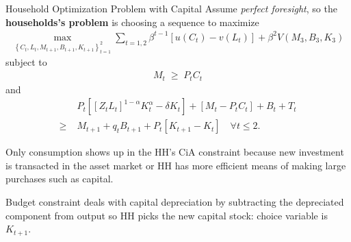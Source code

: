 \documentclass[10pt,c,aspectratio=1610,handout]{beamer}
\begin{document}
\begin{frame}{Household Optimization Problem with Capital}
  Assume \emph{perfect foresight}, so the \textbf{households's problem} is choosing a sequence to maximize%
  \begin{align*}%
    \max_{\left\{ C_{t},L_{t},M_{t+1},B_{t+1},K_{t+1}\right\}_{t=1}^{2}} \sum_{t=1,2} \beta^{t-1} \left[ u(C_{t})-v(L_{t}) \right] + \beta^{2}V(M_{3},B_{3},K_{3})%
  \end{align*}%
  subject to%
  \begin{align*}%
    M_{t} \; \geq \; P_{t} C_{t}%
  \end{align*}%
  and%
  \begin{align*}%
    & \; P_{t} \left[ \left[ Z_{t} L_{t}\right]^{1-\alpha} K_{t}^{\alpha} - \delta K_{t} \right] +\left[ M_{t}-P_{t}C_{t} \right] + B_{t} + T_{t} \\%
    \geq & \; M_{t+1} + q_{t} B_{t+1} + P_{t} \left[ K_{t+1}-K_{t} \right] \quad \forall t \leq 2.%
  \end{align*}%
  \vspace*{-0.2in}%
  \pause%
  \begin{itemize}%
    \begin{small}%
      \item[$\blacktriangleright$] Only consumption shows up in the HH's CiA constraint because new investment is transacted in the asset market or HH has more efficient means of making large purchases such as capital.%
      \pause%
      \item[$\blacktriangleright$] Budget constraint deals with capital depreciation by subtracting the depreciated component from output so HH picks the new capital stock: choice variable is $K_{t+1}$.%
    \end{small}%
  \end{itemize}%
\end{frame}%
\end{document}
